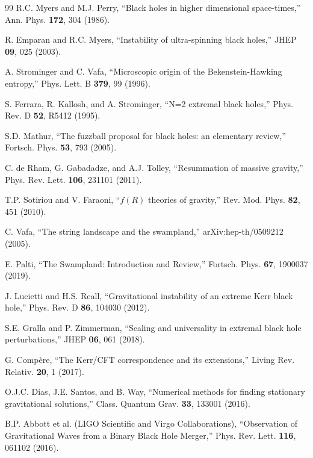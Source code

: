 \documentclass[12pt,a4paper]{article}
\begin{document}
\begin{thebibliography}{99}
R.C. Myers and M.J. Perry, ``Black holes in higher dimensional space-times,'' Ann. Phys. \textbf{172}, 304 (1986).

R. Emparan and R.C. Myers, ``Instability of ultra-spinning black holes,'' JHEP \textbf{09}, 025 (2003).

A. Strominger and C. Vafa, ``Microscopic origin of the Bekenstein-Hawking entropy,'' Phys. Lett. B \textbf{379}, 99 (1996).

S. Ferrara, R. Kallosh, and A. Strominger, ``N=2 extremal black holes,'' Phys. Rev. D \textbf{52}, R5412 (1995).

S.D. Mathur, ``The fuzzball proposal for black holes: an elementary review,'' Fortsch. Phys. \textbf{53}, 793 (2005).

C. de Rham, G. Gabadadze, and A.J. Tolley, ``Resummation of massive gravity,'' Phys. Rev. Lett. \textbf{106}, 231101 (2011).

T.P. Sotiriou and V. Faraoni, ``$f(R)$ theories of gravity,'' Rev. Mod. Phys. \textbf{82}, 451 (2010).

C. Vafa, ``The string landscape and the swampland,'' arXiv:hep-th/0509212 (2005).

E. Palti, ``The Swampland: Introduction and Review,'' Fortsch. Phys. \textbf{67}, 1900037 (2019).

J. Lucietti and H.S. Reall, ``Gravitational instability of an extreme Kerr black hole,'' Phys. Rev. D \textbf{86}, 104030 (2012).

S.E. Gralla and P. Zimmerman, ``Scaling and universality in extremal black hole perturbations,'' JHEP \textbf{06}, 061 (2018).

G. Compère, ``The Kerr/CFT correspondence and its extensions,'' Living Rev. Relativ. \textbf{20}, 1 (2017).

O.J.C. Dias, J.E. Santos, and B. Way, ``Numerical methods for finding stationary gravitational solutions,'' Class. Quantum Grav. \textbf{33}, 133001 (2016).

B.P. Abbott et al. (LIGO Scientific and Virgo Collaborations), ``Observation of Gravitational Waves from a Binary Black Hole Merger,'' Phys. Rev. Lett. \textbf{116}, 061102 (2016).



\end{thebibliography}
\end{document}
